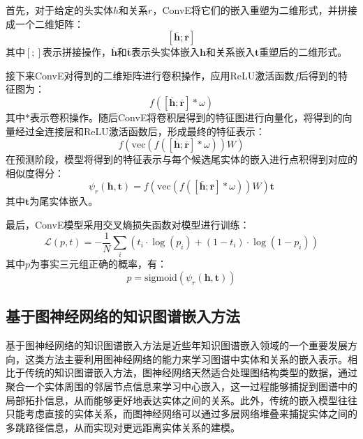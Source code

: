 首先，对于给定的头实体$h$和关系$r$，ConvE将它们的嵌入重塑为二维形式，并拼接成一个二维矩阵：
\begin{equation}
  \left[\overline{\boldsymbol{h}};\overline{\boldsymbol{r}}\right] 
\end{equation}
其中$\left[;\right]$表示拼接操作，$\overline{\boldsymbol{h}}$和$\overline{\boldsymbol{t}}$表示头实体嵌入$\boldsymbol{h}$和关系嵌入$\boldsymbol{t}$重塑后的二维形式。

接下来ConvE对得到的二维矩阵进行卷积操作，应用ReLU激活函数$f$后得到的特征图为：
\begin{equation}
  f\left(\left[\overline{\boldsymbol{h}};\overline{\boldsymbol{r}}\right]\ast \omega\right)
\end{equation}
其中$\ast$表示卷积操作。随后ConvE将卷积层得到的特征图进行向量化，将得到的向量经过全连接层和ReLU激活函数后，形成最终的特征表示：
\begin{equation}
  f\left(\mbox{vec}\left(f\left(\left[\overline{\boldsymbol{h}};\overline{\boldsymbol{r}}\right]\ast \omega\right)\right)W\right)
\end{equation}
在预测阶段，模型将得到的特征表示与每个候选尾实体的嵌入进行点积得到对应的相似度得分：
\begin{equation}
  \psi_r(\boldsymbol{h},\boldsymbol{t})=f\left(\mbox{vec}\left(f\left(\left[\overline{\boldsymbol{h}};\overline{\boldsymbol{r}}\right]\ast \omega\right)\right)W\right)\boldsymbol{t}
\end{equation}
其中$\boldsymbol{t}$为尾实体嵌入。

最后，ConvE模型采用交叉熵损失函数对模型进行训练：
\begin{equation}
  \mathcal{L} (p,t)=-\frac{1}{N}\sum_i(t_i\cdot \log (p_i)+(1-t_i)\cdot\log(1-p_i))
\end{equation}
其中$p$为事实三元组正确的概率，有：
\begin{equation}
  p=\mbox{sigmoid}(\psi_r(\boldsymbol{h},\boldsymbol{t}))
\end{equation}

\subsection{基于图神经网络的知识图谱嵌入方法}
基于图神经网络的知识图谱嵌入方法是近些年知识图谱嵌入领域的一个重要发展方向，这类方法主要利用图神经网络的能力来学习图谱中实体和关系的嵌入表示。相比于传统的知识图谱嵌入方法，图神经网络天然适合处理图结构类型的数据，通过聚合一个实体周围的邻居节点信息来学习中心嵌入，这一过程能够捕捉到图谱中的局部拓扑信息，从而能够更好地表达实体之间的关系。此外，传统的嵌入模型往往只能考虑直接的实体关系，而图神经网络可以通过多层网络堆叠来捕捉实体之间的多跳路径信息，从而实现对更远距离实体关系的建模。

